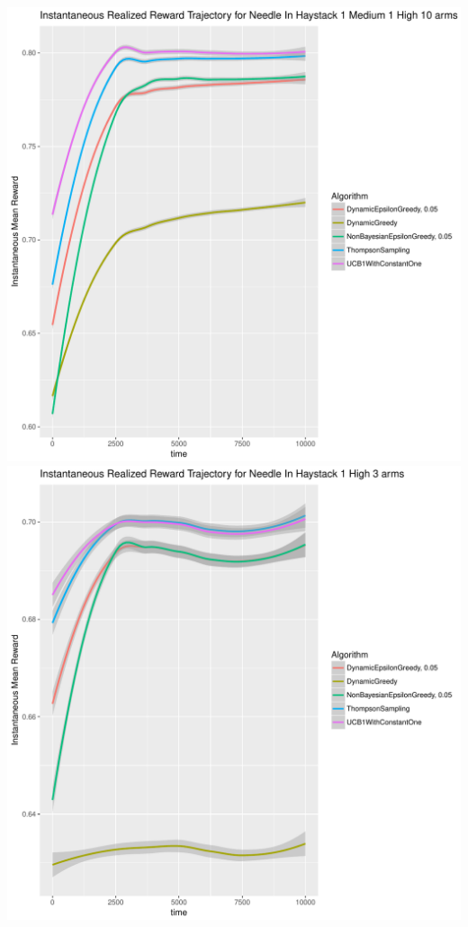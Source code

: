 \documentclass[11pt,letterpaper]{article}
\begin{document}
\includegraphics[scale=0.5]{"../results/preliminary_figures/Instantaneous Realized Reward Trajectory for Needle In Haystack 1 Medium 1 High 10 arms"} \\
\includegraphics[scale=0.5]{"../results/preliminary_figures/Instantaneous Realized Reward Trajectory for Needle In Haystack 1 High 3 arms"} \\
\end{document}

